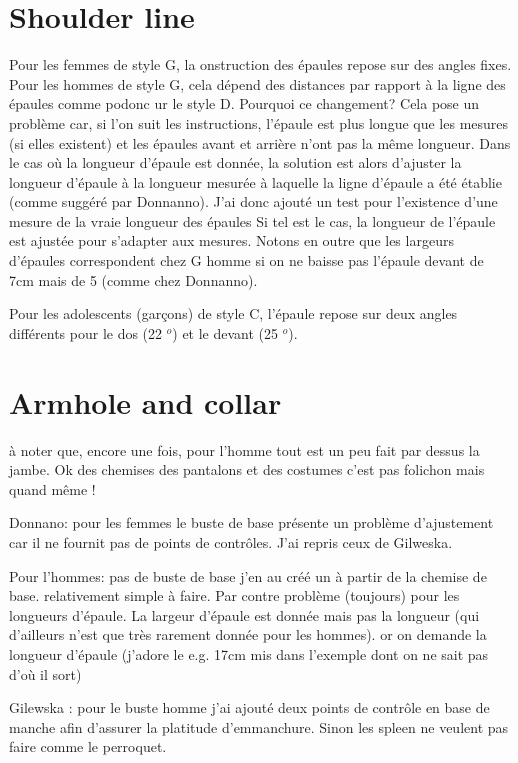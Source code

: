 \documentclass[10pt,a4paper,twoside]{report}
\begin{document}
\section{Shoulder line}

Pour les femmes de style G, la  onstruction des épaules repose sur des angles fixes. Pour les hommes de style G, cela dépend des distances par rapport à la ligne des épaules comme podonc ur le style D. Pourquoi ce changement? Cela pose un problème car, si l'on suit les instructions, l'épaule est plus longue que les mesures (si elles existent) et les épaules avant et arrière n'ont pas la même longueur. Dans le cas où la longueur d'épaule est donnée, la solution est alors d'ajuster la longueur d'épaule à la longueur mesurée à laquelle la ligne d'épaule a été établie (comme suggéré par Donnanno). J'ai donc ajouté un test pour l'existence d'une mesure de la vraie longueur des épaules Si tel est le cas, la longueur de l'épaule est ajustée pour s'adapter aux mesures. Notons en outre que les largeurs d'épaules correspondent chez G homme si on ne baisse pas l'épaule devant de 7cm mais de 5 (comme chez Donnanno).


Pour les adolescents (garçons) de style C, l'épaule repose sur deux angles différents pour le dos (22 $ ^ o $) et le devant (25 $ ^ o $).



\section{Armhole and collar}

à noter que, encore une fois, pour l'homme tout est un peu fait par dessus
la jambe. Ok des chemises des pantalons et des costumes c'est pas
folichon mais quand même !

Donnano:  pour les femmes le buste de base présente un problème d'ajustement car il ne
fournit pas de points de contrôles. J'ai repris ceux de Gilweska.

Pour l'hommes: pas de buste de base j'en au  créé un à partir de la chemise de base.
relativement simple à faire. Par contre problème (toujours) pour les
longueurs d'épaule. La largeur d'épaule est donnée mais pas la
longueur (qui d'ailleurs n'est que très rarement donnée pour les
hommes). or on demande la longueur d'épaule (j'adore le e.g. 17cm mis
dans l'exemple dont on ne sait pas d'où il sort)

Gilewska : pour le buste homme j'ai ajouté  deux points de contrôle
en base de manche  afin d'assurer la platitude d'emmanchure. Sinon les
spleen ne veulent pas faire comme le perroquet.
\end{document}
